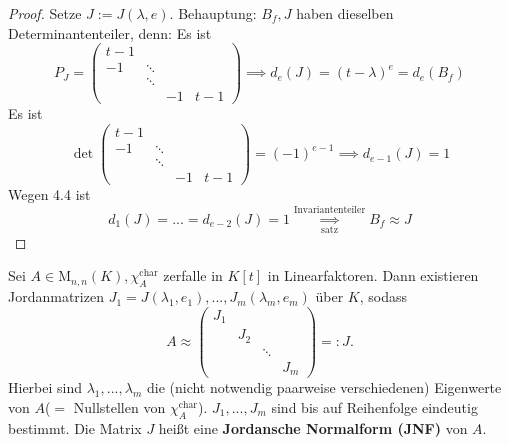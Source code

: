 \documentclass[a4paper, titlepage]{article}
\theoremstyle{definition}
\newcommand{\M}{\mathrm{M}}
\begin{document}
    \begin{proof}
    Setze $J:=J(\lambda, e).$\newline
    Behauptung: $B_f,J$ haben dieselben Determinantenteiler,\newline
    denn: Es ist $$P_J=\begin{pmatrix}
        t-1 & & & \\
        -1 &\ddots & & \\
        & \ddots & &\\
        & & -1 & t-1 
    \end{pmatrix}\implies d_e(J)=(t-\lambda)^{e}=d_e(B_f)$$
    Es ist $$\det \begin{pmatrix}
        t-1 & & & \\
        -1 &\ddots & & \\
        & \ddots & &\\
        & & -1 & t-1 
    \end{pmatrix}= (-1)^{e-1}\implies d_{e-1}(J)=1$$
    Wegen 4.4 ist $$d_1(J)=...=d_{e-2}(J)=1\overset{\text{Invariantenteiler}}{\underset{\text{satz}}{\implies} }B_f\approx J$$
    \end{proof}
    \begin{satz}
        Sei $A\in \M_{n,n}(K),\chi_{A}^{\text{char}}$ zerfalle in $K[t]$ in Linearfaktoren. Dann existieren Jordanmatrizen $J_1=J(\lambda_1,e_1),...,J_m(\lambda_m,e_m)$ über $K$, sodass
        $$ A\approx \begin{pmatrix}
            J_1& & & \\
            & J_2 & &\\
            & & \ddots & \\
            & & & J_m
        \end{pmatrix}=: J.$$
    Hierbei sind $\lambda_1,...,\lambda_m$ die (nicht notwendig paarweise verschiedenen) Eigenwerte von $A$($=$ Nullstellen von $\chi_{A}^{\text{char}}$). $J_1,...,J_m$ sind bis auf Reihenfolge eindeutig bestimmt. Die Matrix $J$ heißt eine \textbf{Jordansche Normalform (JNF)} von $A$.
    \end{satz}
\end{document}
